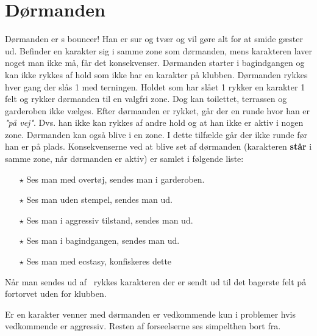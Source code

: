 \section{Dørmanden}
Dørmanden er \LeClub s bouncer! Han er sur og tvær og vil gøre alt for at smide gæster ud. Befinder en karakter sig i samme zone som dørmanden, mens karakteren laver noget man ikke må, får det konsekvenser. Dørmanden starter i bagindgangen og kan ikke rykkes af hold som ikke har en karakter på klubben. Dørmanden rykkes hver gang der slås 1 med terningen. Holdet som har slået 1 rykker en karakter 1 felt og rykker dørmanden til en valgfri zone. Dog kan toilettet, terrassen og garderoben ikke vælges. Efter dørmanden er rykket, går der en runde hvor han er \textit{"på vej"}. Dvs. han ikke kan rykkes af andre hold og at han ikke er aktiv i nogen zone. Dørmanden kan også blive i en zone. I dette tilfælde går der ikke runde før han er på plads. Konsekvenserne ved at blive set af dørmanden (karakteren \textbf{står} i samme zone, når dørmanden er aktiv) er samlet i følgende liste:
\begin{itemize}
\item[$\star$] Ses man med overtøj, sendes man i garderoben.
\item[$\star$] Ses man uden stempel, sendes man ud.
\item[$\star$] Ses man i aggressiv tilstand, sendes man ud.
\item[$\star$] Ses man i bagindgangen, sendes man ud.
\item[$\star$] Ses man med ecstasy, konfiskeres dette
\end{itemize} 

Når man sendes ud af \LeClub\ rykkes karakteren der er sendt ud til det bagerste felt på fortorvet uden for klubben.

Er en karakter venner med dørmanden er vedkommende kun i problemer hvis vedkommende er aggressiv. Resten af forseelserne ses simpelthen bort fra. 